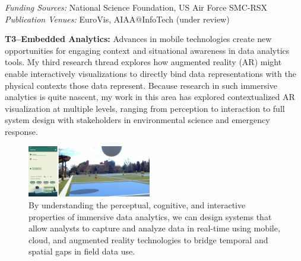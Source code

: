 \documentclass[11pt]{article}
\begin{document}

\emph{Funding Sources:} National Science Foundation, US Air Force SMC-RSX\\
\emph{Publication Venues:} EuroVis, AIAA@InfoTech (under review)

\textbf{T3--Embedded Analytics: }
Advances in mobile technologies create new opportunities for engaging context and situational awareness in data analytics tools. My third research thread explores how augmented reality (AR) might enable interactively visualizations to directly bind data representations with the physical contexts those data represent. Because research in such immersive analytics is quite nascent, my work in this area has explored contextualized AR visualization at multiple levels, ranging from perception to interaction to full system design with stakeholders in environmental science and emergency response. 

\begin{figure}
	\begin{center}
		\includegraphics[width=0.48\textwidth]{fieldview}
	\end{center}
	\caption{By understanding the perceptual, cognitive, and interactive properties of immersive data analytics, we can design systems that allow analysts to capture and analyze data in real-time using mobile, cloud, and augmented reality technologies to bridge temporal and spatial gaps in field data use.}\label{fieldview}
\end{figure}
\end{document}
